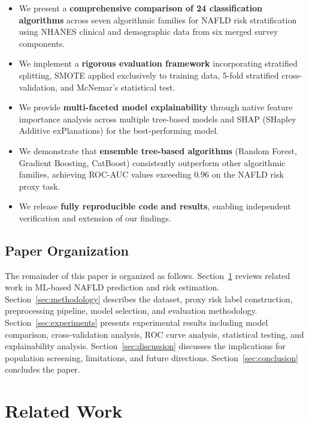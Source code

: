 \documentclass[conference,10pt]{IEEEtran}
\begin{document}
\begin{itemize}
    \item We present a \textbf{comprehensive comparison of 24 classification algorithms} across seven algorithmic families for NAFLD risk stratification using NHANES clinical and demographic data from six merged survey components.
    \item We implement a \textbf{rigorous evaluation framework} incorporating stratified splitting, SMOTE applied exclusively to training data, 5-fold stratified cross-validation, and McNemar's statistical test.
    \item We provide \textbf{multi-faceted model explainability} through native feature importance analysis across multiple tree-based models and SHAP (SHapley Additive exPlanations) for the best-performing model.
    \item We demonstrate that \textbf{ensemble tree-based algorithms} (Random Forest, Gradient Boosting, CatBoost) consistently outperform other algorithmic families, achieving ROC-AUC values exceeding 0.96 on the NAFLD risk proxy task.
    \item We release \textbf{fully reproducible code and results}, enabling independent verification and extension of our findings.
\end{itemize}

\subsection{Paper Organization}

The remainder of this paper is organized as follows. Section~\ref{sec:related_work} reviews related work in ML-based NAFLD prediction and risk estimation. Section~\ref{sec:methodology} describes the dataset, proxy risk label construction, preprocessing pipeline, model selection, and evaluation methodology. Section~\ref{sec:experiments} presents experimental results including model comparison, cross-validation analysis, ROC curve analysis, statistical testing, and explainability analysis. Section~\ref{sec:discussion} discusses the implications for population screening, limitations, and future directions. Section~\ref{sec:conclusion} concludes the paper.


\section{Related Work}
\label{sec:related_work}
\end{document}
